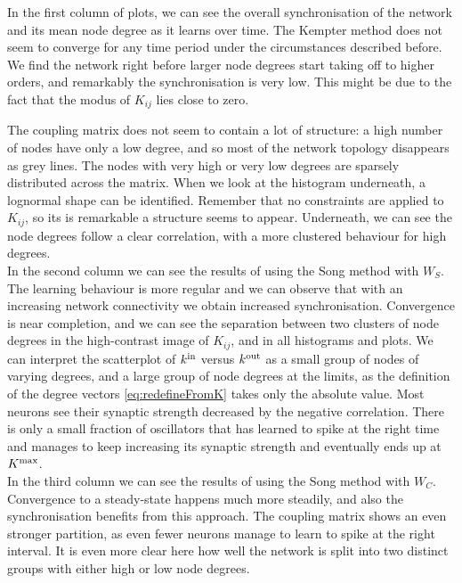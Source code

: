 In the first column of plots, we can see the overall synchronisation of the network and its mean node degree as it learns over time. The Kempter method does not seem to converge for any time period under the circumstances described before. We find the network right before larger node degrees start taking off to higher orders, and remarkably the synchronisation is very low. This might be due to the fact that the modus of $K_{ij}$ lies close to zero.

The coupling matrix does not seem to contain a lot of structure: a high number of nodes have only a low degree, and so most of the network topology disappears as grey lines. The nodes with very high or very low degrees are sparsely distributed across the matrix. When we look at the histogram underneath, a lognormal shape can be identified. Remember that no constraints are applied to $K_{ij}$, so its is remarkable a structure seems to appear. Underneath, we can see the node degrees follow a clear correlation, with a more clustered behaviour for high degrees. \\

In the second column we can see the results of using the Song method with $W_S$. The learning behaviour is more regular and we can observe that with an increasing network connectivity we obtain increased synchronisation. Convergence is near completion, and we can see the separation between two clusters of node degrees in the high-contrast image of $K_{ij}$, and in all histograms and plots. We can interpret the scatterplot of ${k^{\rm in}}$ versus ${k^{\rm out}}$ as a small group of nodes of varying degrees, and a large group of node degrees at the limits, as the definition of the degree vectors \eqref{eq:redefineFromK} takes only the absolute value. Most neurons see their synaptic strength decreased by the negative correlation. There is only a small fraction of oscillators that has learned to spike at the right time and manages to keep increasing its synaptic strength and eventually ends up at $K^{\rm max}$. \\%

In the third column we can see the results of using the Song method with $W_C$. Convergence to a steady-state happens much more steadily, and also the synchronisation benefits from this approach. The coupling matrix shows an even stronger partition, as even fewer neurons manage to learn to spike at the right interval. It is even more clear here how well the network is split into two distinct groups with either high or low node degrees.\\


